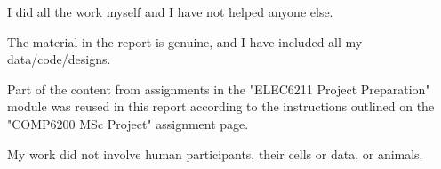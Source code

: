 \begin{StatementofOriginality}
\vskip10pt

\begin{tcolorbox}
I did all the work myself and I have not helped anyone else.
\end{tcolorbox}

\vskip10pt

\begin{tcolorbox}
The material in the report is genuine, and I have included all my data/code/designs.
\end{tcolorbox}

\vskip10pt


\begin{tcolorbox}
Part of the content from assignments in the "ELEC6211 Project Preparation" module was reused in this report according to the instructions outlined on the "COMP6200 MSc Project" assignment page.
\end{tcolorbox}

\vskip10pt

\begin{tcolorbox}
My work did not involve human participants, their cells or data, or animals.
\end{tcolorbox}

\end{StatementofOriginality}